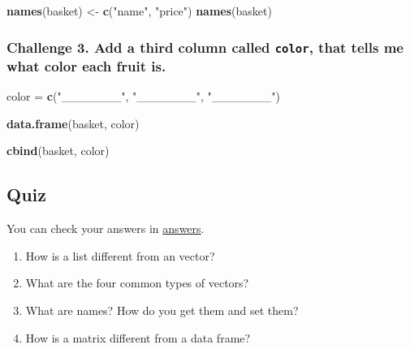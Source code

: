 \documentclass[]{book}
\newenvironment{Shaded}{\begin{snugshade}}{\end{snugshade}}
\newcommand{\KeywordTok}[1]{\textcolor[rgb]{0.13,0.29,0.53}{\textbf{#1}}}
\newcommand{\StringTok}[1]{\textcolor[rgb]{0.31,0.60,0.02}{#1}}
\newcommand{\NormalTok}[1]{#1}
\begin{document}
\begin{Shaded}
\begin{Highlighting}[]
\KeywordTok{names}\NormalTok{(basket) <-}\StringTok{ }\KeywordTok{c}\NormalTok{(}\StringTok{"name"}\NormalTok{, }\StringTok{"price"}\NormalTok{)}
\KeywordTok{names}\NormalTok{(basket)}
\end{Highlighting}
\end{Shaded}

\subsubsection*{\texorpdfstring{Challenge 3. Add a third column called
\texttt{color}, that tells me what color each fruit
is.}{Challenge 3. Add a third column called color, that tells me what color each fruit is.}}\label{challenge-3.-add-a-third-column-called-color-that-tells-me-what-color-each-fruit-is.}

\begin{Shaded}
\begin{Highlighting}[]

\NormalTok{color =}\StringTok{ }\KeywordTok{c}\NormalTok{(}\StringTok{"_______"}\NormalTok{, }\StringTok{"_______"}\NormalTok{, }\StringTok{"_______"}\NormalTok{)}

\KeywordTok{data.frame}\NormalTok{(basket, color)}

\KeywordTok{cbind}\NormalTok{(basket, color)}
\end{Highlighting}
\end{Shaded}

\subsection{Quiz}\label{quiz}

You can check your answers in
\protect\hyperlink{data-structure-answers}{answers}.

\begin{enumerate}
\def\labelenumi{\arabic{enumi}.}
\item
  How is a list different from an vector?
\item
  What are the four common types of vectors?
\item
  What are names? How do you get them and set them?
\item
  How is a matrix different from a data frame?
\end{enumerate}
\end{document}
